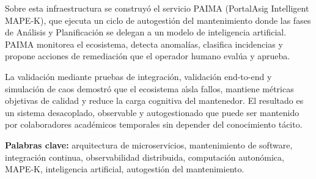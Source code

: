 Sobre esta infraestructura se construy\'{o} el servicio PAIMA (PortalAsig
Intelligent MAPE-K), que ejecuta un ciclo de autogesti\'{o}n del mantenimiento donde
las fases de An\'{a}lisis y Planificaci\'{o}n se delegan a un modelo de inteligencia
artificial. PAIMA monitorea el ecosistema, detecta anomal\'{i}as, clasifica
incidencias y propone acciones de remediaci\'{o}n que el operador humano eval\'{u}a y
aprueba.

La validaci\'{o}n mediante pruebas de integraci\'{o}n, validaci\'{o}n end-to-end y
simulaci\'{o}n de caos demostr\'{o} que el ecosistema a\'{\i}sla fallos, mantiene m\'{e}tricas
objetivas de calidad y reduce la carga cognitiva del mantenedor. El resultado es
un sistema desacoplado, observable y autogestionado que puede ser mantenido por
colaboradores acad\'{e}micos temporales sin depender del conocimiento t\'{a}cito.

\vspace{1em}
\noindent\textbf{Palabras clave:} arquitectura de microservicios, mantenimiento de
software, integraci\'{o}n continua, observabilidad distribuida, computaci\'{o}n auton\'{o}mica,
MAPE-K, inteligencia artificial, autogesti\'{o}n del mantenimiento.

\newpage
\tableofcontents
\newpage
\listoffigures
\newpage
